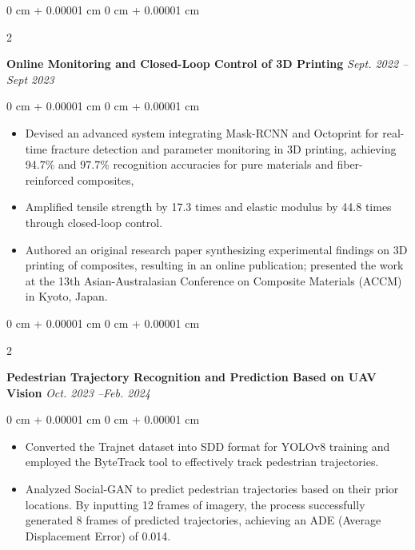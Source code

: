 ﻿\documentclass[10pt, letterpaper]{article}
\newenvironment{highlights}{
    \begin{itemize}[
        topsep=0.10 cm,
        parsep=0.10 cm,
        partopsep=0pt,
        itemsep=0pt,
        leftmargin=0 cm + 10pt
    ]
}{
    \end{itemize}
} %
\newenvironment{onecolentry}{
    \begin{adjustwidth}{
        0 cm + 0.00001 cm
    }{
        0 cm + 0.00001 cm
    }
}{
    \end{adjustwidth}
} %
\newenvironment{twocolentry}[2][]{
    \onecolentry
    \def\secondColumn{#2}
    \setcolumnwidth{\fill, 4.5 cm}
    \begin{paracol}{2}
}{
    \switchcolumn \raggedleft \secondColumn
    \end{paracol}
    \endonecolentry
} %
\begin{document}
        \begin{twocolentry}{
            \textit{Sept. 2022 --Sept 2023}
        }
            \textbf{Online Monitoring and Closed-Loop Control of 3D Printing}\end{twocolentry}
        \vspace{0.10 cm}
        \begin{onecolentry}
            \begin{highlights}
                \item Devised an advanced system integrating Mask-RCNN and Octoprint for real-time fracture detection and parameter monitoring in 3D printing, achieving 94.7\% and 97.7\% recognition accuracies for pure materials and fiber-reinforced composites,
                \item Amplified tensile strength by 17.3 times and elastic modulus by 44.8 times through closed-loop control.
                \item Authored an original research paper synthesizing experimental findings on 3D printing of composites, resulting in an online publication; presented the work at the 13th Asian-Australasian Conference on Composite Materials (ACCM) in Kyoto, Japan.
                
            \end{highlights}
        \end{onecolentry}
        \vspace{0.2 cm}

        \begin{twocolentry}{
            \textit{Oct. 2023 --Feb. 2024}
        }
            \textbf{Pedestrian Trajectory Recognition and Prediction Based on UAV Vision}\end{twocolentry}
        \vspace{0.10 cm}
        \begin{onecolentry}
            \begin{highlights}
                \item Converted the Trajnet dataset into SDD format for YOLOv8 training and employed the ByteTrack tool to effectively track pedestrian trajectories.
                
                \item Analyzed Social-GAN to predict pedestrian trajectories based on their prior locations. By inputting 12 frames of imagery, the process successfully generated 8 frames of predicted trajectories, achieving an ADE (Average Displacement Error) of 0.014.

            \end{highlights}
        \end{onecolentry}
        
\end{document}

